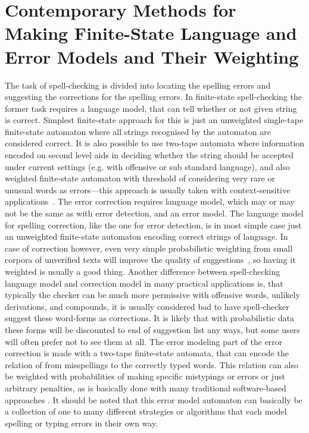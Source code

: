 \documentclass[a4paper,12pt]{article}
\begin{document}
\section{Contemporary Methods for Making Finite-State Language and Error Models
and Their Weighting}
\label{sec:methods}

The task of spell-checking is divided into locating the spelling errors and
suggesting the corrections for the spelling errors. In finite-state
spell-checking the former task requires a language model, that can tell whether
or not given string is correct. Simplest finite-state approach for this is just
an unweighted single-tape finite-state automaton where all strings recognised
by the automaton are considered correct. It is also possible to use two-tape
automata where information encoded on second level aids in deciding whether the
string should be accepted under current settings (e.g. with offensive or sub
standard language), and also weighted finite-state automaton with threshold of
considering very rare or unusual words as errors---this approach is usually
taken with context-sensitive applications~\cite[]{otero/2007}. The error
correction requires language model, which may or may not be the same as with
error detection, and an error model. The language model for spelling
correction, like the one for error detection, is in most simple case just an
unweighted finite-state automaton encoding correct strings of language. In case
of correction however, even very simple probabilistic weighting from small
corpora of unverified texts will improve the quality of
suggestions~\cite[]{pirinen/2010/lrec}, so having it weighted is usually a good
thing. Another difference between spell-checking language model and correction
model in many practical applications is, that typically the checker can be much
more permissive with offensive words, unlikely derivations, and compounds, it
is usually considered bad to have spell-checker suggest these word-forms as
corrections. It is likely that with probabilistic data these forms will be
discounted to end of suggestion list any ways, but some users will often prefer
not to see them at all. The error modeling part of the error correction is made
with a two-tape finite-state automata, that can encode the relation of from
misspellings to the correctly typed words. This relation can also be weighted
with probabilities of making specific mistypings or errors or just arbitrary
penalties, as is basically done with many traditional software-based approaches
\cite[such as][]{hunspell/manual}. It should be noted that this error model
automaton can basically be a collection of one to many different strategies or
algorithms that each model spelling or typing errors in their own way.
\end{document}
